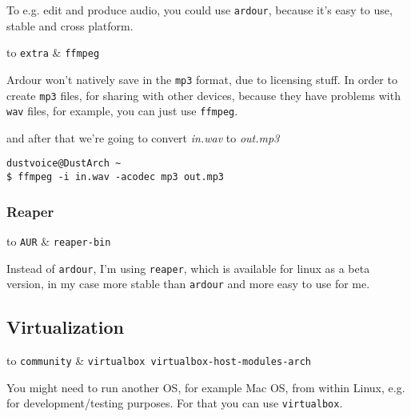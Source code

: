 \documentclass[9pt]{report}
\newenvironment{NOTE}
{\begin{tcolorbox}[colback=admonitionBG,coltitle=draculaFG,colframe=draculaBlue,colbacktitle=draculaBlue,title=NOTE]}
{\end{tcolorbox}}
\newenvironment{packagetable}
{\begin{longtabu}to \textwidth [b]{X[1,r]|X[1,l]}}
{\end{longtabu}}
\begin{document}
To e.g. edit and produce audio, you could use \texttt{ardour}, because it’s easy to use, stable and cross platform.


\begin{NOTE}
    \begin{packagetable}
        \texttt{extra} & \texttt{ffmpeg} \\ 
    \end{packagetable}

    Ardour won’t natively save in the \texttt{mp3} format, due to licensing stuff.
    In order to create \texttt{mp3} files, for sharing with other devices, because they have problems with \texttt{wav} files, for example, you can just use \texttt{ffmpeg}.


    and after that we’re going to convert \textit{in.wav} to \textit{out.mp3}


    \begin{verbatim}
dustvoice@DustArch ~
$ ffmpeg -i in.wav -acodec mp3 out.mp3
    \end{verbatim}
\end{NOTE}

\hypertarget{x-reaper}{\subsubsection{Reaper}}
\begin{packagetable}
    \texttt{AUR} & \texttt{reaper-bin} \\ 
\end{packagetable}

Instead of \texttt{ardour}, I’m using \texttt{reaper}, which is available for linux as a beta version, in my case more stable than \texttt{ardour} and more easy to use for me.



\newpage

\hypertarget{x-virtualization}{\subsection{Virtualization}}
\begin{packagetable}
    \texttt{community} & \texttt{virtualbox virtualbox-host-modules-arch} \\ 
\end{packagetable}

You might need to run another OS, for example Mac OS, from within Linux, e.g. for development/testing purposes.
For that you can use \texttt{virtualbox}.
\end{document}

